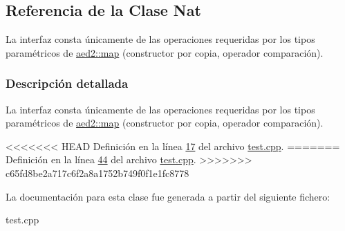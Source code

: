\hypertarget{classNat}{\subsection{\-Referencia de la \-Clase \-Nat}
\label{classNat}
}


\-La interfaz consta únicamente de las operaciones requeridas por los tipos paramétricos de \hyperlink{classaed2_1_1map}{aed2\-::map} (constructor por copia, operador comparación).  




\subsubsection{\-Descripción detallada}
\-La interfaz consta únicamente de las operaciones requeridas por los tipos paramétricos de \hyperlink{classaed2_1_1map}{aed2\-::map} (constructor por copia, operador comparación). 

<<<<<<< HEAD
\-Definición en la línea \hyperlink{test_8cpp_source_l00017}{17} del archivo \hyperlink{test_8cpp_source}{test.\-cpp}.
=======
Definición en la línea \hyperlink{test_8cpp_source_l00044}{44} del archivo \hyperlink{test_8cpp_source}{test.\+cpp}.
>>>>>>> c65fd8be2a717c6f2a8a1752b749f0f1e1fc8778



\-La documentación para esta clase fue generada a partir del siguiente fichero\-:\begin{DoxyCompactItemize}
\item 
test.\-cpp\end{DoxyCompactItemize}
